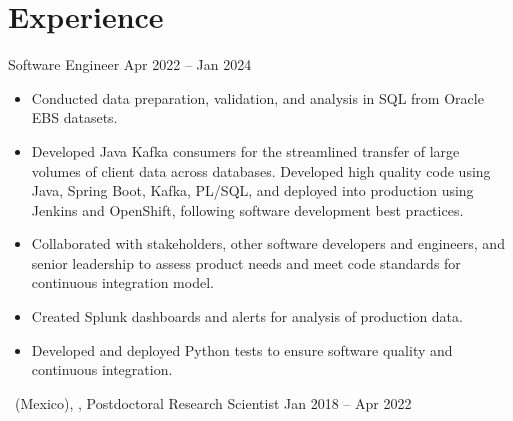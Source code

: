 \section{Experience}
\cventry{}%
{\PYX}%
{Software Engineer}%
{Apr 2022 -- Jan 2024}%
{}%
{%
\begin{itemize}
    \item Conducted data preparation, validation, and analysis in SQL from Oracle EBS datasets.
    \item Developed Java Kafka consumers for the streamlined transfer of large volumes of client data across databases. Developed high quality code using Java, Spring Boot, Kafka, PL/SQL, and deployed into production using Jenkins and OpenShift, following software development best practices.
    \item Collaborated with stakeholders, other software developers and engineers, and senior leadership to assess product needs and meet code standards for continuous integration model.
    \item Created Splunk dashboards and alerts for analysis of production data.
    \item Developed and deployed Python tests to ensure software quality and continuous integration.
\end{itemize}
}
\cventry{}%
{\UMSNH\ (Mexico), \Purdue, \RIT}%
{Postdoctoral Research Scientist}%
{Jan 2018 -- Apr 2022}%
{}%
